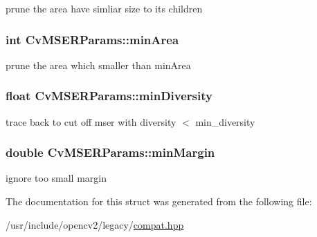 prune the area have simliar size to its children 

\hypertarget{structCvMSERParams_aa05b341d994d1fd85e199f5c4fe41db0}{
\subsubsection[{min\-Area}]{\setlength{\rightskip}{0pt plus 5cm}int Cv\-M\-S\-E\-R\-Params\-::min\-Area}}\label{structCvMSERParams_aa05b341d994d1fd85e199f5c4fe41db0}


prune the area which smaller than min\-Area 

\hypertarget{structCvMSERParams_addc1cf6caebd85fa2eee45be5cafe613}{
\subsubsection[{min\-Diversity}]{\setlength{\rightskip}{0pt plus 5cm}float Cv\-M\-S\-E\-R\-Params\-::min\-Diversity}}\label{structCvMSERParams_addc1cf6caebd85fa2eee45be5cafe613}


trace back to cut off mser with diversity $<$ min\-\_\-diversity 

\hypertarget{structCvMSERParams_ad06b0684eab5f764baf1ddcb9627dbe0}{
\subsubsection[{min\-Margin}]{\setlength{\rightskip}{0pt plus 5cm}double Cv\-M\-S\-E\-R\-Params\-::min\-Margin}}\label{structCvMSERParams_ad06b0684eab5f764baf1ddcb9627dbe0}


ignore too small margin 



The documentation for this struct was generated from the following file\-:\begin{DoxyCompactItemize}
\item 
/usr/include/opencv2/legacy/\hyperlink{compat_8hpp}{compat.\-hpp}\end{DoxyCompactItemize}
